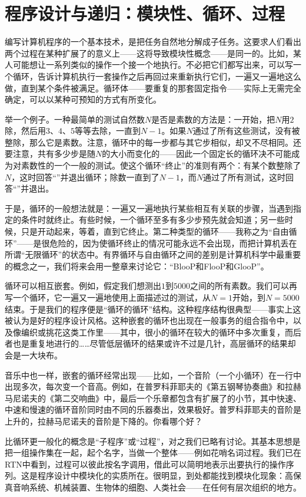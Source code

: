 \section{程序设计与递归：模块性、循环、过程}

编写计算机程序的一个基本技术，是把任务自然地分解成子任务。这要求人们看出两个过程在某种扩展了的意义上——这将导致模块性概念——是同一的。比如，某人可能想让一系列类似的操作一个接一个地执行。不必把它们都写出来，可以写一个循环，告诉计算机执行一套操作之后再回过来重新执行它们，一遍又一遍地这么做，直到某个条件被满足。循环体——要重复的那套固定指令——实际上无需完全确定，可以以某种可预知的方式有所变化。

举一个例子。一种最简单的测试自然数$N$是否是素数的方法是：一开始，把$N$用$2$除，然后用$3$、$4$、$5$等等去除，一直到$N-1$。如果$N$通过了所有这些测试，没有被整除，那么它是素数。注意，循环中的每一步都与其它步相似，却又不尽相同。还要注意，共有多少步是随$N$的大小而变化的——因此一个固定长的循环决不可能成为对素数性的一个一般的测试。使这个循环“终止”的准则有两个：有某个数整除了$N$，这时回答“”并退出循环；除数一直到了$N-1$，而$N$通过了所有测试，这时回答“”并退出。

于是，循环的一般想法就是：一遍又一遍地执行某些相互有关联的步骤，当遇到指定的条件时就终止。有些时候，一个循环至多有多少步预先就会知道；另一些时候，只是开动起来，等着，直到它终止。第二种类型的循环——我称之为“自由循环”——是很危险的，因为使循环终止的情况可能永远不会出现，而把计算机丢在所谓“无限循环”的状态中。有界循环与自由循环之间的差别是计算机科学中最重要的概念之一，我们将来会用一整章来讨论它：“BlooP和FlooP和GlooP”。

循环可以相互嵌套。例如，假定我们想测出$1$到$5000$之间的所有素数。我们可以再写一个循环，它一遍又一遍地使用上面描述过的测试，从$N=1$开始，到$N=5000$结束。于是我们的程序便是“循环的循环”结构。这种程序结构很典型——事实上这被认为是好的程序设计风格。这种嵌套的循环也出现在一般事务的组合指令中，以及像编织或挑花这类工作里——其中，很小的循环在较大的循环中多次重复，而后者也是重复地进行的……尽管低层循环的结果或许不过是几针，高层循环的结果却会是一大块布。

音乐中也一样，嵌套的循环经常出现——比如，一个音阶（一个小循环）在一行中出现多次，每次变一个音高。例如，在普罗科菲耶夫的《第五钢琴协奏曲》和拉赫马尼诺夫的《第二交响曲》中，最后一个乐章都包含有扩展了的小节，其中快速、中速和慢速的循环音阶同时由不同的乐器奏出，效果极好。普罗科菲耶夫的音阶是上升的，拉赫马尼诺夫的音阶是下降的。你看哪个好？

比循环更一般化的概念是“子程序”或“过程”，对之我们已略有讨论。其基本思想是把一组操作集在一起，起个名字，当做一个整体——例如花哨名词过程。我们已在RTN中看到，过程可以彼此按名字调用，借此可以简明地表示出要执行的操作序列。这是程序设计中模块化的实质所在。很明显，到处都能找到模块化现象：高保真音响系统、机械装置、生物体的细胞、人类社会——在任何有层次组织的地方。

